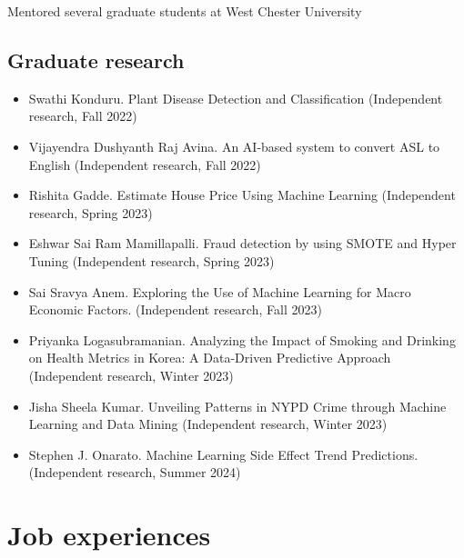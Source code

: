 \documentclass{article}
\begin{document}
\noindent Mentored several graduate students at West Chester University
\subsection*{Graduate research}
\begin{itemize}
 \setlength\itemsep{-0.5em}
    \item Swathi Konduru. Plant Disease Detection and Classification (Independent research, Fall 2022)
    \item Vijayendra Dushyanth Raj Avina. An AI-based system to convert ASL to English (Independent research, Fall 2022)
    \item Rishita Gadde. Estimate House Price Using Machine Learning (Independent research, Spring 2023)
    \item Eshwar Sai Ram Mamillapalli. Fraud detection by using SMOTE and Hyper Tuning 	(Independent research, Spring 2023)
    \item Sai Sravya Anem. Exploring the Use of Machine Learning for Macro Economic Factors. (Independent research, Fall 2023)
    \item Priyanka Logasubramanian. Analyzing the Impact of Smoking and Drinking on Health Metrics in Korea: A Data-Driven Predictive Approach (Independent research, Winter 2023)
    \item Jisha Sheela Kumar. Unveiling Patterns in NYPD Crime through Machine Learning and Data Mining	(Independent research, Winter 2023)
    \item Stephen J. Onarato. Machine Learning Side Effect Trend Predictions. (Independent research, Summer 2024)
\end{itemize}


% 
\section*{Job experiences}\vspace{-0.5em}
\end{document}
